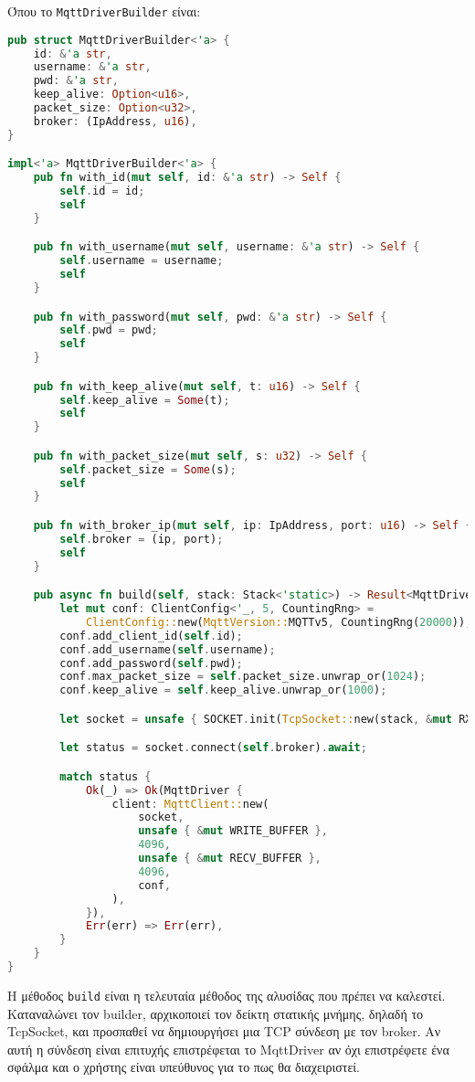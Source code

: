 Όπου το \verb|MqttDriverBuilder| είναι:

\begin{lstlisting}[language=Rust]
 pub struct MqttDriverBuilder<'a> {
    id: &'a str,
    username: &'a str,
    pwd: &'a str,
    keep_alive: Option<u16>,
    packet_size: Option<u32>,
    broker: (IpAddress, u16),
}

impl<'a> MqttDriverBuilder<'a> {
    pub fn with_id(mut self, id: &'a str) -> Self {
        self.id = id;
        self
    }

    pub fn with_username(mut self, username: &'a str) -> Self {
        self.username = username;
        self
    }

    pub fn with_password(mut self, pwd: &'a str) -> Self {
        self.pwd = pwd;
        self
    }

    pub fn with_keep_alive(mut self, t: u16) -> Self {
        self.keep_alive = Some(t);
        self
    }

    pub fn with_packet_size(mut self, s: u32) -> Self {
        self.packet_size = Some(s);
        self
    }

    pub fn with_broker_ip(mut self, ip: IpAddress, port: u16) -> Self {
        self.broker = (ip, port);
        self
    }

    pub async fn build(self, stack: Stack<'static>) -> Result<MqttDriver<'a>, ConnectError> {
        let mut conf: ClientConfig<'_, 5, CountingRng> =
            ClientConfig::new(MqttVersion::MQTTv5, CountingRng(20000));
        conf.add_client_id(self.id);
        conf.add_username(self.username);
        conf.add_password(self.pwd);
        conf.max_packet_size = self.packet_size.unwrap_or(1024);
        conf.keep_alive = self.keep_alive.unwrap_or(1000);

        let socket = unsafe { SOCKET.init(TcpSocket::new(stack, &mut RX_BUFFER, &mut TX_BUFFER)) };

        let status = socket.connect(self.broker).await;

        match status {
            Ok(_) => Ok(MqttDriver {
                client: MqttClient::new(
                    socket,
                    unsafe { &mut WRITE_BUFFER },
                    4096,
                    unsafe { &mut RECV_BUFFER },
                    4096,
                    conf,
                ),
            }),
            Err(err) => Err(err),
        }
    }
} 
\end{lstlisting}

Η μέθοδος \verb|build| είναι η τελευταία μέθοδος της αλυσίδας που
πρέπει να καλεστεί. Καταναλώνει τον builder, αρχικοποιεί τον δείκτη
στατικής μνήμης, δηλαδή το TcpSocket, και προσπαθεί να δημιουργήσει
μια TCP σύνδεση με τον broker. Αν αυτή η σύνδεση είναι επιτυχής
επιστρέφεται το MqttDriver αν όχι επιστρέφετε ένα σφάλμα και ο χρήστης
είναι υπεύθυνος για το πως θα διαχειριστεί.

